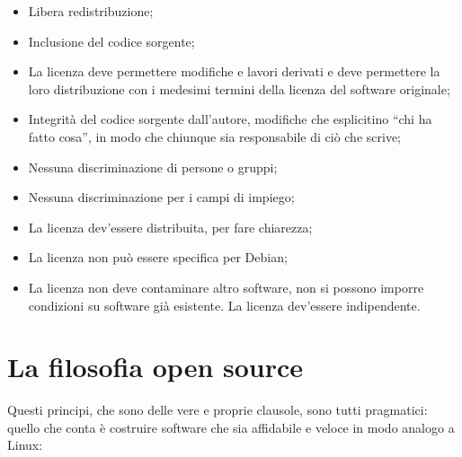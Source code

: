\begin{itemize}
	
	\item Libera redistribuzione;
	\item Inclusione del codice sorgente;
	\item La licenza deve permettere modifiche e lavori derivati e deve permettere la loro distribuzione con i medesimi termini della licenza del software originale;
	\item Integrità del codice sorgente dall'autore, modifiche che esplicitino ``chi ha fatto cosa'', in modo che chiunque sia responsabile di ciò che scrive;
	\item Nessuna discriminazione di persone o gruppi;
	\item Nessuna discriminazione per i campi di impiego;
	\item La licenza dev'essere distribuita, per fare chiarezza;
	\item La licenza non può essere specifica per Debian;
	\item La licenza non deve contaminare altro software, non si possono imporre condizioni su software già esistente. La licenza dev'essere indipendente.
	
\end{itemize}


\section{La filosofia open source}

Questi principi, che sono delle vere e proprie clausole, sono tutti pragmatici: quello che conta è costruire software che sia affidabile e veloce in modo analogo a Linux:

